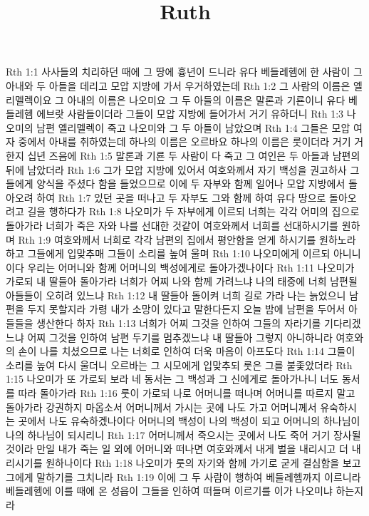 

\title{Ruth}

Rth 1:1  사사들의 치리하던 때에 그 땅에 흉년이 드니라 유다 베들레헴에 한 사람이 그 아내와 두 아들을 데리고 모압 지방에 가서 우거하였는데
Rth 1:2  그 사람의 이름은 엘리멜렉이요 그 아내의 이름은 나오미요 그 두 아들의 이름은 말론과 기룐이니 유다 베들레헴 에브랏 사람들이더라 그들이 모압 지방에 들어가서 거기 유하더니
Rth 1:3  나오미의 남편 엘리멜렉이 죽고 나오미와 그 두 아들이 남았으며
Rth 1:4  그들은 모압 여자 중에서 아내를 취하였는데 하나의 이름은 오르바요 하나의 이름은 룻이더라 거기 거한지 십년 즈음에
Rth 1:5  말론과 기룐 두 사람이 다 죽고 그 여인은 두 아들과 남편의 뒤에 남았더라
Rth 1:6  그가 모압 지방에 있어서 여호와께서 자기 백성을 권고하사 그들에게 양식을 주셨다 함을 들었으므로 이에 두 자부와 함께 일어나 모압 지방에서 돌아오려 하여
Rth 1:7  있던 곳을 떠나고 두 자부도 그와 함께 하여 유다 땅으로 돌아오려고 길을 행하다가
Rth 1:8  나오미가 두 자부에게 이르되 너희는 각각 어미의 집으로 돌아가라 너희가 죽은 자와 나를 선대한 것같이 여호와께서 너희를 선대하시기를 원하며
Rth 1:9  여호와께서 너희로 각각 남편의 집에서 평안함을 얻게 하시기를 원하노라 하고 그들에게 입맞추매 그들이 소리를 높여 울며
Rth 1:10  나오미에게 이르되 아니니이다 우리는 어머니와 함께 어머니의 백성에게로 돌아가겠나이다
Rth 1:11  나오미가 가로되 내 딸들아 돌아가라 너희가 어찌 나와 함께 가려느냐 나의 태중에 너희 남편될 아들들이 오히려 있느냐
Rth 1:12  내 딸들아 돌이켜 너희 길로 가라 나는 늙었으니 남편을 두지 못할지라 가령 내가 소망이 있다고 말한다든지 오늘 밤에 남편을 두어서 아들들을 생산한다 하자
Rth 1:13  너희가 어찌 그것을 인하여 그들의 자라기를 기다리겠느냐 어찌 그것을 인하여 남편 두기를 멈추겠느냐 내 딸들아 그렇지 아니하니라 여호와의 손이 나를 치셨으므로 나는 너희로 인하여 더욱 마음이 아프도다
Rth 1:14  그들이 소리를 높여 다시 울더니 오르바는 그 시모에게 입맞추되 룻은 그를 붙좇았더라
Rth 1:15  나오미가 또 가로되 보라 네 동서는 그 백성과 그 신에게로 돌아가나니 너도 동서를 따라 돌아가라
Rth 1:16  룻이 가로되 나로 어머니를 떠나며 어머니를 따르지 말고 돌아가라 강권하지 마옵소서 어머니께서 가시는 곳에 나도 가고 어머니께서 유숙하시는 곳에서 나도 유숙하겠나이다 어머니의 백성이 나의 백성이 되고 어머니의 하나님이 나의 하나님이 되시리니
Rth 1:17  어머니께서 죽으시는 곳에서 나도 죽어 거기 장사될 것이라 만일 내가 죽는 일 외에 어머니와 떠나면 여호와께서 내게 벌을 내리시고 더 내리시기를 원하나이다
Rth 1:18  나오미가 룻의 자기와 함께 가기로 굳게 결심함을 보고 그에게 말하기를 그치니라
Rth 1:19  이에 그 두 사람이 행하여 베들레헴까지 이르니라 베들레헴에 이를 때에 온 성읍이 그들을 인하여 떠들며 이르기를 이가 나오미냐 하는지라
